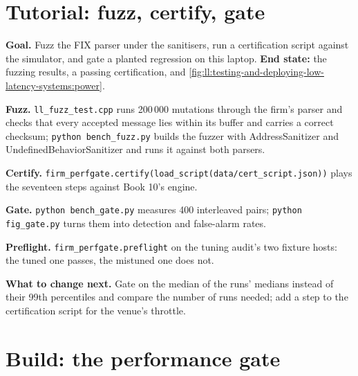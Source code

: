 \section{Tutorial: fuzz, certify, gate}\label{tut:ll:testing-and-deploying-low-latency-systems:tut}

\begin{tutorial}
\textbf{Goal.} Fuzz the FIX parser under the sanitisers, run a certification script against the simulator, and gate a planted
regression on this laptop. \textbf{End state:} the fuzzing results, a passing certification, and
\cref{fig:ll:testing-and-deploying-low-latency-systems:power}.
\begin{tutsteps}
\item \textbf{Fuzz.} \texttt{ll\_fuzz\_test.cpp} runs 200\,000 mutations through the firm's parser and checks that every
accepted message lies within its buffer and carries a correct checksum; \texttt{python bench\_fuzz.py} builds the fuzzer with
AddressSanitizer and UndefinedBehaviorSanitizer and runs it against both parsers.
\item \textbf{Certify.} \texttt{firm\_perfgate.certify(load\_script(\textquotedbl{}data/cert\_script.json\textquotedbl{}))}
plays the seventeen steps against Book 10's engine.
\item \textbf{Gate.} \texttt{python bench\_gate.py} measures 400 interleaved pairs; \texttt{python fig\_gate.py} turns them into
detection and false-alarm rates.
\item \textbf{Preflight.} \texttt{firm\_perfgate.preflight} on the tuning audit's two fixture hosts: the tuned one passes, the
mistuned one does not.
\end{tutsteps}
\textbf{What to change next.} Gate on the median of the runs' medians instead of their 99th percentiles and compare the number
of runs needed; add a step to the certification script for the venue's throttle.
\end{tutorial}

\section{Build: the performance gate}\label{bld:ll:testing-and-deploying-low-latency-systems:perfgate}

